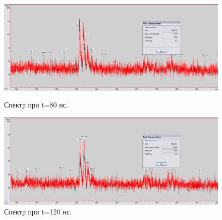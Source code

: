 \documentclass[12pt]{article}
\begin{document}
\begin{flushleft}
\begin{figure}[!h]
\begin{center}
\begin{minipage}[h]{0.4\linewidth}
\includegraphics[width=1.2\linewidth]{22}
\caption{Спектр при t=80 нс.} %
\label{ris:experimoriginal} %
\end{minipage}
\hfill 
\begin{minipage}[h]{0.4\linewidth}
\includegraphics[width=1.2\linewidth]{23}
\caption{Спектр при t=120 нс.}
\label{ris:experimcoded}
\end{minipage}
\end{center}
\end{figure}


\end{flushleft}
\end{document}
